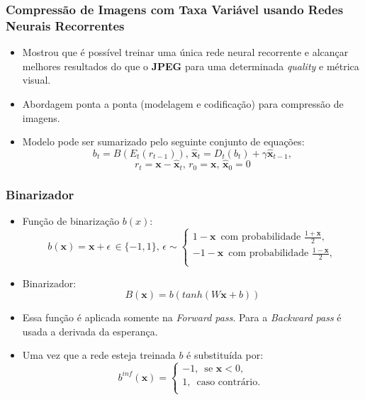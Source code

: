 \documentclass{beamer}
\begin{document}
\begin{frame}
\frametitle{Compressão de Imagens com Taxa Variável usando Redes Neurais Recorrentes~\cite{toderici}}
\begin{itemize}
\item Mostrou que é possível treinar uma única rede neural recorrente e alcançar melhores resultados do que o \textbf{JPEG} para uma determinada \textit{quality} e métrica visual.
\item Abordagem ponta a ponta (modelagem e codificação) para compressão de imagens.
\item Modelo pode ser sumarizado pelo seguinte conjunto de equações:
      $$b_t = B(E_t(r_{t-1})), \, \hat{\mathbf{x}}_t = D_t(b_t) + \gamma\hat{\mathbf{x}}_{t-1},$$
      $$r_t = \mathbf{x} - \hat{\mathbf{x}}_t, \, r_0 = \mathbf{x}, \, \hat{\mathbf{x}}_0 = 0$$
\end{itemize}
\end{frame}
\begin{frame}
\frametitle{Binarizador}
\begin{itemize}
\item Função de binarização $b(x)$:
\begin{equation} b(\mathbf{x}) = \mathbf{x} + \epsilon \,\in \{-1, 1\},\, \epsilon \sim \begin{cases} 
1 - \mathbf{x}\, \text{ com probabilidade } \frac{1+\mathbf{x}}{2},\\
-1 - \mathbf{x}\, \text{ com probabilidade } \frac{1-\mathbf{x}}{2},\\
\end{cases} \end{equation}
\item Binarizador: \begin{equation} B(\mathbf{x}) = b(tanh(W\mathbf{x} + b)) \end{equation}
\item Essa função é aplicada somente na \textit{Forward pass}. Para a \textit{Backward pass} é usada a derivada da esperança.
\item Uma vez que a rede esteja treinada $b$ é substituída por:
\begin{equation}
b^{inf}(\mathbf{x}) = \begin{cases}
-1,\, \text{ se } \mathbf{x} < 0,\\
1,\, \text{ caso contrário. }\\
\end{cases}
\end{equation}
\end{itemize}
\end{frame}
\end{document}
